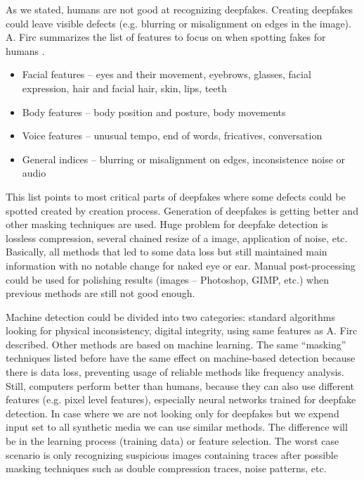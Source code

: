 As we stated, humans are not good at recognizing deepfakes. Creating deepfakes could leave visible defects (e.g. blurring or misalignment on edges in the image). A. Firc summarizes the list of features to focus on when spotting fakes for humans \cite{ApplicabilityOfDeepfakes}.

\begin{itemize}
\item Facial features – eyes and their movement, eyebrows, glasses, facial expression, hair and facial hair, skin, lips, teeth
\item Body features – body position and posture, body movements
\item Voice features – unusual tempo, end of words, fricatives, conversation
\item General indices – blurring or misalignment on edges, inconsistence noise or audio
\end{itemize}
	
This list points to most critical parts of deepfakes where some defects could be spotted created by creation process. Generation of deepfakes is getting better and other masking techniques are used. Huge problem for deepfake detection is lossless compression, several chained resize of a image, application of noise, etc. Basically, all methods that led to some data loss but still maintained main information with no notable change for naked eye or ear.  Manual post-processing could be used for polishing results (images – Photoshop, GIMP, etc.) when previous methods are still not good enough.

Machine detection could be divided into two categories: standard algorithms looking for physical inconsistency, digital integrity, using same features as A. Firc described. Other methods are based on machine learning. The same “masking” techniques listed before have the same effect on machine-based detection because there is data loss, preventing usage of reliable methods like frequency analysis. Still, computers perform better than humans, because they can also use different features (e.g. pixel level features), especially neural networks trained for deepfake detection. In case where we are not looking only for deepfakes but we expend input set to all synthetic media we can use similar methods. The difference will be in the learning process (training data) or feature selection. The worst case scenario is only recognizing suspicious images containing traces after possible masking techniques such as double compression traces, noise patterns, etc. \cite{MediaForensicsandDeepFakes}

